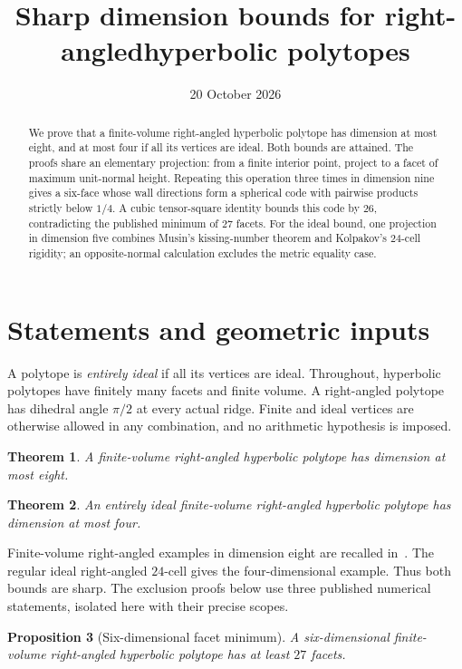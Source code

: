 \documentclass[11pt]{article}
\title{Sharp dimension bounds for right-angled\linebreak hyperbolic polytopes}
\author{}
\date{20 October 2026}
\newtheorem{theorem}{Theorem}
\newtheorem{proposition}[theorem]{Proposition}
\theoremstyle{remark}
\begin{document}
\maketitle
\begin{abstract}
We prove that a finite-volume right-angled hyperbolic polytope has
dimension at most eight, and at most four if all its vertices are ideal.
Both bounds are attained. The proofs share an elementary projection:
from a finite interior point, project to a facet of maximum unit-normal
height. Repeating this operation three times in dimension nine gives
a six-face whose wall directions form a spherical code with pairwise
products strictly below $1/4$. A cubic tensor-square identity bounds
this code by $26$, contradicting the published minimum of $27$ facets.
For the ideal bound, one projection in dimension five combines
Musin's kissing-number theorem and Kolpakov's $24$-cell rigidity;
an opposite-normal calculation excludes the metric equality case.
\end{abstract}

\section{Statements and geometric inputs}

A polytope is \emph{entirely ideal} if all its vertices are ideal.
Throughout, hyperbolic polytopes have finitely many facets and finite
volume. A right-angled polytope has dihedral angle $\pi/2$ at every
actual ridge. Finite and ideal vertices are otherwise allowed in any
combination, and no arithmetic hypothesis is imposed.

\begin{theorem}\label{thm:general}
A finite-volume right-angled hyperbolic polytope has dimension at
most eight.
\end{theorem}

\begin{theorem}\label{thm:ideal}
An entirely ideal finite-volume right-angled hyperbolic polytope has
dimension at most four.
\end{theorem}

Finite-volume right-angled examples in dimension eight are recalled
in~\cite{PV}. The regular ideal right-angled $24$-cell gives the
four-dimensional example. Thus both bounds are sharp. The exclusion
proofs below use three published numerical statements, isolated here
with their precise scopes.

\begin{proposition}[Six-dimensional facet minimum]\label{prop:27}
A six-dimensional finite-volume right-angled hyperbolic polytope
has at least $27$ facets.
\end{proposition}
\end{document}
